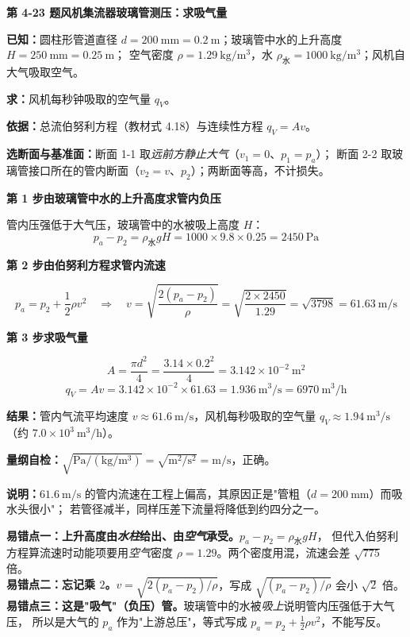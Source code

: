 \noindent\textbf{第 4-23 题\quad 风机集流器玻璃管测压：求吸气量}

\begin{jie}
\textbf{已知：}圆柱形管道直径 $d=200\ \mathrm{mm}=0.2\ \mathrm{m}$；玻璃管中水的上升高度 $H=250\ \mathrm{mm}=0.25\ \mathrm{m}$；
空气密度 $\rho=1.29\ \mathrm{kg/m^3}$，水 $\rho_{\text{水}}=1000\ \mathrm{kg/m^3}$；风机自大气吸取空气。

\textbf{求：}风机每秒钟吸取的空气量 $q_V$。

\textbf{依据：}总流伯努利方程（教材式 4.18）与连续性方程 $q_V=Av$。

\textbf{选断面与基准面：}断面 1-1 取\emph{远前方静止大气}（$v_1=0$、$p_1=p_a$）；
断面 2-2 取玻璃管接口所在的管内断面（$v_2=v$、$p_2$）；两断面等高，不计损失。

\textbf{第 1 步\quad 由玻璃管中水的上升高度求管内负压}

管内压强低于大气压，玻璃管中的水被吸上高度 $H$：
\[ p_a-p_2=\rho_{\text{水}}gH=1000\times9.8\times0.25=2450\ \mathrm{Pa} \]

\textbf{第 2 步\quad 由伯努利方程求管内流速}

\[ p_a=p_2+\frac{1}{2}\rho v^2
   \quad\Longrightarrow\quad
   v=\sqrt{\frac{2\left(p_a-p_2\right)}{\rho}}=\sqrt{\frac{2\times2450}{1.29}}=\sqrt{3798}=61.63\ \mathrm{m/s} \]

\textbf{第 3 步\quad 求吸气量}

\[ A=\frac{\pi d^2}{4}=\frac{3.14\times0.2^2}{4}=3.142\times10^{-2}\ \mathrm{m^2} \]
\[ q_V=Av=3.142\times10^{-2}\times61.63=1.936\ \mathrm{m^3/s}=6970\ \mathrm{m^3/h} \]

\textbf{结果：}管内气流平均速度 $v\approx61.6\ \mathrm{m/s}$，风机每秒吸取的空气量 $q_V\approx1.94\ \mathrm{m^3/s}$（约 $7.0\times10^3\ \mathrm{m^3/h}$）。

\textbf{量纲自检：}$\sqrt{\mathrm{Pa/(kg/m^3)}}=\sqrt{\mathrm{m^2/s^2}}=\mathrm{m/s}$，正确。

\textbf{说明：}$61.6\ \mathrm{m/s}$ 的管内流速在工程上偏高，其原因正是"管粗（$d=200\ \mathrm{mm}$）而吸水头很小"；
若管径减半，同样压差下流量将降低到约四分之一。
\end{jie}

\begin{yicuo}
\textbf{易错点一：上升高度由\emph{水柱}给出、由\emph{空气}承受。}$p_a-p_2=\rho_{\text{水}}gH$，
但代入伯努利方程算流速时动能项要用\emph{空气}密度 $\rho=1.29$。两个密度用混，流速会差 $\sqrt{775}$ 倍。\\
\textbf{易错点二：忘记乘 $2$。}$v=\sqrt{2(p_a-p_2)/\rho}$，写成 $\sqrt{(p_a-p_2)/\rho}$ 会小 $\sqrt{2}$ 倍。\\
\textbf{易错点三：这是"吸气"（负压）管。}玻璃管中的水被\emph{吸上}说明管内压强低于大气压，
所以是大气的 $p_a$ 作为"上游总压"，等式写成 $p_a=p_2+\frac{1}{2}\rho v^2$，不能写反。
\end{yicuo}

